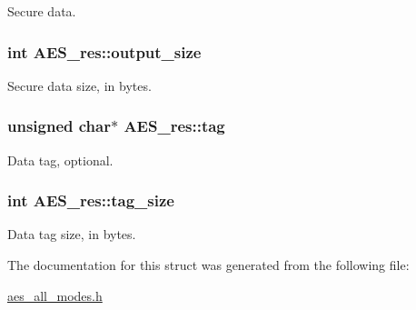 Secure data. 

\hypertarget{struct_a_e_s__res_a5a411bbb0139ee066b9a50c44cae8cef}{
\subsubsection[{output\+\_\+size}]{\setlength{\rightskip}{0pt plus 5cm}int A\+E\+S\+\_\+res\+::output\+\_\+size}}\label{struct_a_e_s__res_a5a411bbb0139ee066b9a50c44cae8cef}


Secure data size, in bytes. 

\hypertarget{struct_a_e_s__res_af57433723c87b6125943c41fa902269a}{
\subsubsection[{tag}]{\setlength{\rightskip}{0pt plus 5cm}unsigned char$\ast$ A\+E\+S\+\_\+res\+::tag}}\label{struct_a_e_s__res_af57433723c87b6125943c41fa902269a}


Data tag, optional. 

\hypertarget{struct_a_e_s__res_acf6cd4c6f86cbf7831928d484af3cc59}{
\subsubsection[{tag\+\_\+size}]{\setlength{\rightskip}{0pt plus 5cm}int A\+E\+S\+\_\+res\+::tag\+\_\+size}}\label{struct_a_e_s__res_acf6cd4c6f86cbf7831928d484af3cc59}


Data tag size, in bytes. 



The documentation for this struct was generated from the following file\+:\begin{DoxyCompactItemize}
\item 
\hyperlink{aes__all__modes_8h}{aes\+\_\+all\+\_\+modes.\+h}\end{DoxyCompactItemize}

